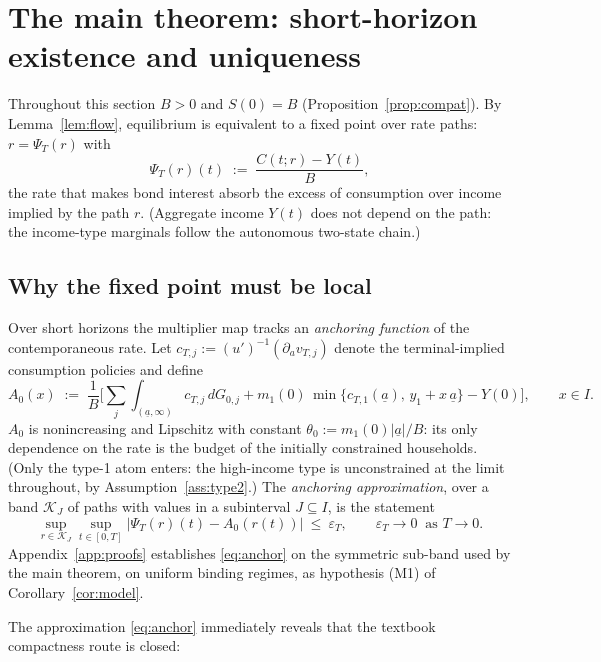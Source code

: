 \documentclass[11pt]{article}
\theoremstyle{definition}
\theoremstyle{remark}
\newcommand{\ubar}[1]{\underline{#1}}
\newcommand{\Kcal}{\mathcal{K}}
\newcommand{\dd}{\,d}
\newcommand{\uba}{\ubar{a}}
\newcommand{\psit}{\Psi_T}
\begin{document}
\section{The main theorem: short-horizon existence and uniqueness}
\label{sec:main}

Throughout this section $B>0$ and $S(0)=B$
(Proposition~\ref{prop:compat}). By Lemma~\ref{lem:flow}, equilibrium
is equivalent to a fixed point over rate paths: $r=\psit(r)$ with
\[
\psit(r)(t)\;:=\;\frac{C(t;r)-Y(t)}{B},
\]
the rate that makes bond interest absorb the excess of consumption
over income implied by the path $r$. (Aggregate income $Y(t)$ does
not depend on the path: the income-type marginals follow the
autonomous two-state chain.)

\subsection{Why the fixed point must be local}
\label{sec:whylocal}

Over short horizons the multiplier map tracks an \emph{anchoring
function} of the contemporaneous rate. Let
$c_{T,j}:=(u')^{-1}(\partial_a v_{T,j})$ denote the terminal-implied
consumption policies and define
\begin{equation}\label{eq:A0}
A_0(x)\;:=\;\frac{1}{B}\Big[\textstyle\sum_j
\int_{(\uba,\infty)}c_{T,j}\dd G_{0,j}
+m_1(0)\,\min\{c_{T,1}(\uba),\,y_1+x\,\uba\}-Y(0)\Big],
\qquad x\in I .
\end{equation}
$A_0$ is nonincreasing and Lipschitz with constant
$\theta_0:=m_1(0)|\uba|/B$: its only dependence on the rate is the
budget of the initially constrained households. (Only the type-1 atom
enters: the high-income type is unconstrained at the limit throughout,
by Assumption~\ref{ass:type2}.) The \emph{anchoring approximation},
over a band $\Kcal_J$ of paths with values in a subinterval
$J\subseteq I$, is the statement
\begin{equation}\label{eq:anchor}
\sup_{r\in\Kcal_J}\sup_{t\in[0,T]}
\big|\psit(r)(t)-A_0(r(t))\big|\ \le\ \varepsilon_T,
\qquad \varepsilon_T\to0\ \text{ as }T\to0 .
\end{equation}
Appendix~\ref{app:proofs} establishes \eqref{eq:anchor} on the
symmetric sub-band used by the main theorem, on uniform binding
regimes, as hypothesis (M1) of Corollary~\ref{cor:model}.

The approximation \eqref{eq:anchor} immediately reveals that the
textbook compactness route is closed:
\end{document}
